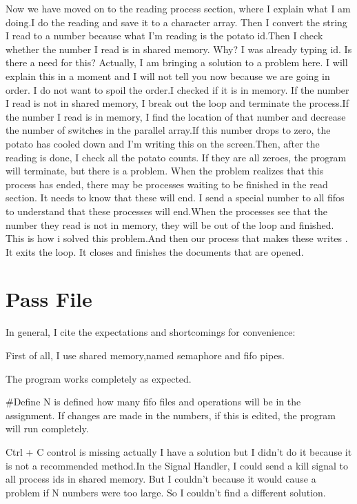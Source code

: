 \documentclass{article}
\begin{document}
Now we have moved on to the reading process section, where I explain what I am doing.I do the reading and save it to a character array. Then I convert the string I read to a number because what I'm reading is the potato id.Then I check whether the number I read is in shared memory. Why? I was already typing id. Is there a need for this? Actually, I am bringing a solution to a problem here. I will explain this in a moment and I will not tell you now because we are going in order. I do not want to spoil the order.I checked if it is in memory. If the number I read is not in shared memory, I break out  the loop and terminate the process.If the number I read is in memory, I find the location of that number and decrease the number of switches in the parallel array.If this number drops to zero, the potato has cooled down and I'm writing this on the screen.Then, after the reading is done, I check all the potato counts. If they are all zeroes, the program will terminate, but there is a problem. When the problem realizes that this process has ended, there may be processes waiting to be finished in the read section. It needs to know that these will end. I send a special number to all fifos to understand that these processes will end.When the processes see that the number they read is not in memory, they will be out of the loop and finished. This is how i solved this problem.And then our process that makes these writes . It exits the loop. It closes and finishes the documents that are opened.



\section{Pass File}

In general, I cite the expectations and shortcomings for convenience:

First of all, I use shared memory,named semaphore and fifo pipes.


The program works completely as expected.


#Define N is defined how many fifo files and operations will be in the assignment. If changes are made in the numbers, if this is edited, the program will run completely.


Ctrl + C control is missing actually I have a solution but I didn't do it because it is not a recommended method.In the Signal Handler, I could send a kill signal to all process ids in shared memory. But I couldn't because it would cause a problem if N numbers were too large. So I couldn't find a different solution.
\end{document}
